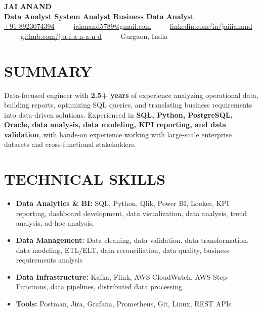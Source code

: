 \documentclass[letterpaper,10pt]{article}
\renewcommand{\normalsize}{%
  \fontsize{10.1}{12.25}\selectfont
}
\begin{document}
\begin{center}
    {\Huge \textbf{JAI ANAND}} \\ \vspace{4pt}
    \large \textbf{Data Analyst \textbar{} System Analyst \textbar{} Business Data Analyst } \\ \vspace{6pt}
    \small
    \href{tel:+918923074394}{\underline{+91 8923074394}} ~~\textbullet~~ 
    \href{mailto:jaianand5789@gmail.com}{\underline{jaianand5789@gmail.com}} ~~\textbullet~~ 
    \href{https://linkedin.com/in/jaiiianand/}{\underline{linkedin.com/in/jaiiianand}} ~~\textbullet~~ 
    \href{https://github.com/j-a-i-a-n-a-n-d}{\underline{github.com/j-a-i-a-n-a-n-d}} ~~\textbullet~~
    Gurgaon, India
\end{center}

\section{SUMMARY}
Data-focused engineer with \textbf{2.5+ years} of experience analyzing operational data, building reports, optimizing SQL queries, and translating business requirements into data-driven solutions. Experienced in \textbf{SQL, Python, PostgreSQL, Oracle, data analysis, data modeling, KPI reporting, and data validation}, with hands-on experience working with large-scale enterprise datasets and cross-functional stakeholders.

\section{TECHNICAL SKILLS}
  \begin{itemize}[leftmargin=0.0in, label={}, itemsep=1pt, parsep=0pt, topsep=0pt]
    \item \normalsize{
     \textbf{\normalsize Data Analytics \& BI:}{ SQL, Python, Qlik, Power BI, Looker, KPI reporting, dashboard development, data visualization, data analysis, trend analysis, ad-hoc analysis,}
    }
    \item \normalsize{
     \textbf{\normalsize Data Management:}{ Data cleaning, data validation, data transformation, data modeling, ETL/ELT, data reconciliation, data quality, business requirements analysis}
    }
    \item \normalsize{
     \textbf{\normalsize Data Infrastructure:}{ Kafka, Flink, AWS CloudWatch, AWS Step Functions, data pipelines, distributed data processing}
    }
    \item \normalsize{
     \textbf{\normalsize Tools:}{ Postman, Jira, Grafana, Prometheus, Git, Linux, REST APIs}
    }
  \end{itemize}
\end{document}
